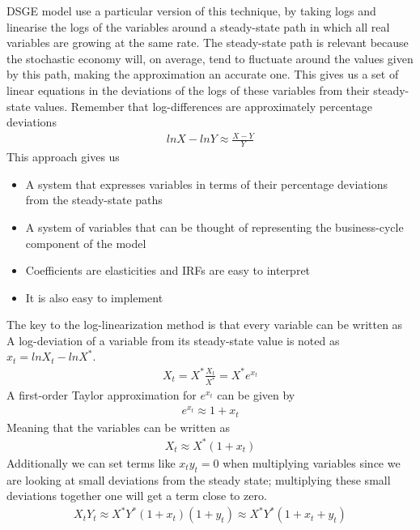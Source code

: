 \documentclass{beamer}
\begin{document}
\begin{frame}
  DSGE model use a particular version of this technique, by taking logs and linearise the logs of the variables around a steady-state path in which all real variables are growing at the same rate.
The steady-state path is relevant because the stochastic economy will, on
average, tend to fluctuate around the values given by this path, making the
approximation an accurate one.
This gives us a set of linear equations in the deviations of the logs of these variables from their steady-state values.
Remember that log-differences are approximately percentage deviations
\begin{align}
  ln X-ln Y \approx \frac{X-Y}{Y}
\end{align}
This approach gives us 
\begin{itemize}
  \item A system that expresses variables in terms of their percentage deviations from the steady-state paths
  \item A system of variables that can be thought of representing the business-cycle component of the model
  \item Coefficients are elasticities and IRFs are easy to interpret
  \item It is also easy to implement
\end{itemize}
\end{frame}

\begin{frame}
The key to the log-linearization method is that every variable can be written as
A log-deviation of a variable from its steady-state value is noted as $x_t=ln X_t - ln X^*$.
\begin{align}
  X_t=X^*\frac{X_t}{X^*}=X^* e^{x_t}
\end{align}
A first-order Taylor approximation for $e^{x_t}$ can be given by
\begin{align}
  e^{x_t}\approx1+x_t
\end{align}
Meaning that the variables can be written as
\begin{align}
  X_t \approx X^*(1+x_t)
\end{align}
Additionally we can set terms like $x_ty_t=0$ when multiplying variables since we are looking at small deviations from the steady state; multiplying these small deviations together one will get a term close to zero.
\begin{align}
  X_tY_t\approx X^*Y^*(1+x_t)(1+y_t) \approx X^*Y^*(1+x_t+y_t)
\end{align}
\end{frame}
\end{document}
